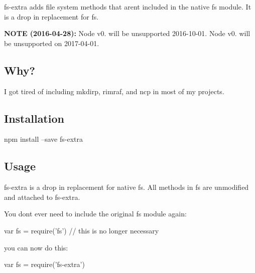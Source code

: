 {\ttfamily fs-\/extra} adds file system methods that aren\textquotesingle{}t included in the native {\ttfamily fs} module. It is a drop in replacement for {\ttfamily fs}.

\href{https://www.npmjs.org/package/fs-extra}{\tt } \href{http://travis-ci.org/jprichardson/node-fs-extra}{\tt } \href{https://ci.appveyor.com/project/jprichardson/node-fs-extra/branch/master}{\tt } \href{https://www.npmjs.org/package/fs-extra}{\tt } \href{https://coveralls.io/r/jprichardson/node-fs-extra}{\tt }

\href{https://github.com/feross/standard}{\tt }

{\bfseries N\+O\+TE (2016-\/04-\/28)\+:} Node v0. will be unsupported 2016-\/10-\/01. Node v0. will be unsupported on 2017-\/04-\/01.

\subsection*{Why? }

I got tired of including {\ttfamily mkdirp}, {\ttfamily rimraf}, and {\ttfamily ncp} in most of my projects.

\subsection*{Installation }

\begin{DoxyVerb}npm install --save fs-extra
\end{DoxyVerb}


\subsection*{Usage }

{\ttfamily fs-\/extra} is a drop in replacement for native {\ttfamily fs}. All methods in {\ttfamily fs} are unmodified and attached to {\ttfamily fs-\/extra}.

You don\textquotesingle{}t ever need to include the original {\ttfamily fs} module again\+:


\begin{DoxyCode}
var fs = require('fs') // this is no longer necessary
\end{DoxyCode}


you can now do this\+:


\begin{DoxyCode}
var fs = require('fs-extra')
\end{DoxyCode}


